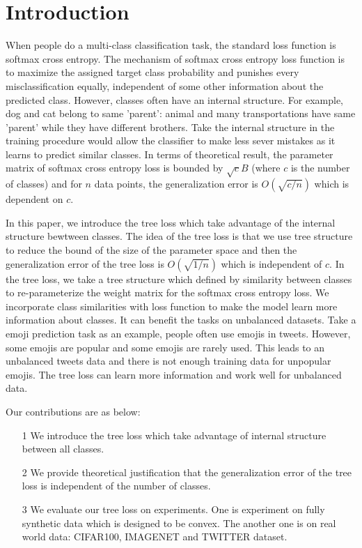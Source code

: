 \documentclass[twoside]{article}
\theoremstyle{definition}
\begin{document}
\section{Introduction}

When people do a multi-class classification task, the standard loss function is softmax cross entropy.
The mechanism of softmax cross entropy loss function is to maximize the assigned target class probability and punishes every misclassification equally, independent of some other information about the predicted class.
However, classes often have an internal structure. 
For example, dog and cat belong to same 'parent': animal and many transportations have same 'parent' while they have different brothers. Take the internal structure in the training procedure would allow the classifier to make less sever mistakes as it learns to predict similar classes.
In terms of theoretical result, the parameter matrix of softmax cross entropy loss is bounded by $\sqrt{c}B$ (where $c$ is the number of classes) and for $n$ data points, the generalization error is $O(\sqrt{c/n})$ which is dependent on $c$.

In this paper, we introduce the tree loss which take advantage of the internal structure bewtween classes.
The idea of the tree loss is that we use tree structure to reduce the bound of the size of the parameter space and then the generalization error of the tree loss is $O(\sqrt{1/n})$ which is independent of $c$.
In the tree loss, we take a tree structure which defined by similarity between classes to re-parameterize the weight matrix for the softmax cross entropy loss.
We incorporate class similarities with loss function to make the model learn more information about classes.
It can benefit the tasks on unbalanced datasets.
Take a emoji prediction task as an example, people often use emojis in tweets.
However, some emojis are popular and some emojis are rarely used.
This leads to an unbalanced tweets data and there is not enough training data for unpopular emojis.
The tree loss can learn more information and work well for unbalanced data.


Our contributions are as below:
\begin{itemize}
    \item [1] 
    We introduce the tree loss which take advantage of internal structure between all classes.
    \item [2] 
    We provide theoretical justification that the generalization error of the tree loss is independent of the number of classes.
    \item [3]
    We evaluate our tree loss on experiments. One is experiment on fully synthetic data which is designed to be convex. The another one is on real world data: CIFAR100, IMAGENET and TWITTER dataset. 
    
\end{itemize}
\end{document}
